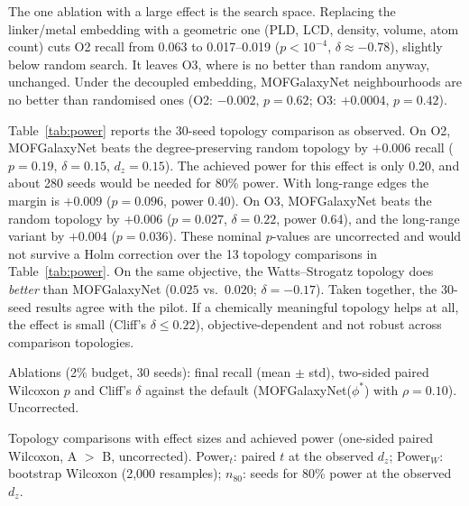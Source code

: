 The one ablation with a large effect is the search space. Replacing the linker/metal embedding with a geometric one (PLD, LCD, density, volume, atom count) cuts O2 recall from 0.063 to 0.017--0.019 ($p<10^{-4}$, $\delta\approx-0.78$), slightly below random search. It leaves O3, where \gs{} is no better than random anyway, unchanged. Under the decoupled embedding, MOFGalaxyNet neighbourhoods are no better than randomised ones (O2: $-0.002$, $p=0.62$; O3: $+0.0004$, $p=0.42$).

Table~\ref{tab:power} reports the 30-seed topology comparison as observed. On O2, MOFGalaxyNet beats the degree-preserving random topology by $+0.006$ recall ($p=0.19$, $\delta=0.15$, $d_z=0.15$). The achieved power for this effect is only 0.20, and about 280 seeds would be needed for 80\% power. With long-range edges the margin is $+0.009$ ($p=0.096$, power 0.40). On O3, MOFGalaxyNet beats the random topology by $+0.006$ ($p=0.027$, $\delta=0.22$, power 0.64), and the long-range variant by $+0.004$ ($p=0.036$). These nominal $p$-values are uncorrected and would not survive a Holm correction over the 13 topology comparisons in Table~\ref{tab:power}. On the same objective, the Watts--Strogatz topology does \emph{better} than MOFGalaxyNet ($0.025$ vs.\ $0.020$; $\delta=-0.17$). Taken together, the 30-seed results agree with the pilot. If a chemically meaningful topology helps at all, the effect is small (Cliff's $\delta\leq0.22$), objective-dependent and not robust across comparison topologies.

\begin{table}[t]
\centering
\caption{Ablations (2\% budget, 30 seeds): final recall (mean $\pm$ std), two-sided paired Wilcoxon $p$ and Cliff's $\delta$ against the default (MOFGalaxyNet($\phi^\ast$) with $\rho=0.10$). Uncorrected.}
\label{tab:ablations}
\scriptsize
\setlength{\tabcolsep}{3pt}
\begin{adjustbox}{max width=\textwidth}\end{adjustbox}
\end{table}

\begin{table}[t]
\centering
\caption{Topology comparisons with effect sizes and achieved power (one-sided paired Wilcoxon, A $>$ B, uncorrected). Power$_t$: paired $t$ at the observed $d_z$; Power$_W$: bootstrap Wilcoxon (2{,}000 resamples); $n_{80}$: seeds for 80\% power at the observed $d_z$.}
\label{tab:power}
\scriptsize
\setlength{\tabcolsep}{2.5pt}
\begin{adjustbox}{max width=\textwidth}\end{adjustbox}
\end{table}

